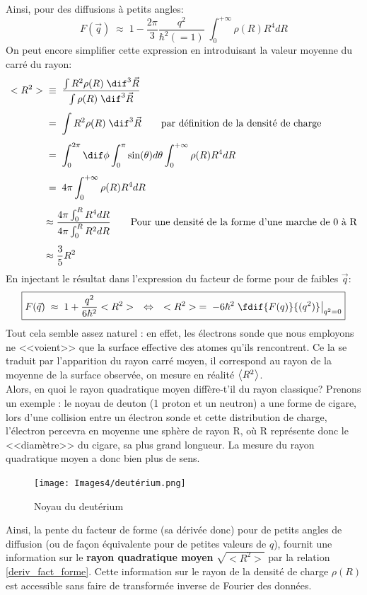 Ainsi, pour des diffusions à petits angles:
\[
    F(\vec{q}) \;\approx\; 1 - \dfrac{2\pi}{3}\dfrac{q^2}{\hbar^2(=1)} \;\int_0^{+\infty}\rho(R) R^4 dR
\]
On peut encore simplifier cette expression en introduisant la valeur moyenne du carré du rayon:
\begin{align*}
    <R^2> &\;\equiv\;
    \dfrac{ \int R^2 \rho(R) \; \dif^3\vec{R} }{ \int \rho(R) \; \dif^3\vec{R} }\\[4pt]
    &\eq
    \int R^2 \rho(R) \; \dif^3\vec{R}
    \qquad \text{par définition de la densité de charge}\\[4pt]
    &\eq
    \int_0^{2\pi}\dif\phi \int_0^{\pi} \sin(\theta) d\theta \int_0^{+\infty}\rho(R) R^4dR\\[4pt]
    &\eq 
    4\pi \int_0^{+\infty}\rho(R) R^4dR\\[4pt]
    &\approx \dfrac{4\pi\int_0^R R^4dR}{4\pi\int_0^R R^2dR} \qquad \text{Pour une densité de la forme d'une marche de 0 à R}\\[4pt]
    &\approx \dfrac{3}{5}R^2
\end{align*}
En injectant le résultat dans l'expression du facteur de forme pour de faibles $\vec{q}$:
\begin{equation}
    \boxed{
    F(\vec{q}) \;\approx\; 1 + \dfrac{q^2}{6\hbar^2} <R^2>
    \quad \Leftrightarrow \quad
    <R^2> \eq -6\hbar^2 \left. \fdif{F(q)}{(q^2)}\right|_{q^2=0}
    }
    \label{deriv_fact_forme}
\end{equation}
Tout cela semble assez naturel :  en effet, les électrons sonde que nous employons ne <<voient>> que la surface effective des atomes qu'ils rencontrent. Ce la se traduit par l'apparition du rayon carré moyen, il correspond au rayon de la moyenne de la surface observée, on mesure en réalité $\expval{R^2}$.\\
Alors, en quoi le rayon quadratique moyen diffère-t'il du rayon classique? Prenons un exemple : le noyau de deuton (1 proton et un neutron) a une forme de cigare, lors d'une collision entre un électron sonde et cette distribution de charge, l'électron percevra en moyenne une sphère de rayon R, où R représente donc le <<diamètre>> du cigare, sa plus grand longueur. La mesure du rayon quadratique moyen a donc bien plus de sens.\\
\begin{figure}[H]
    \centering
    \texttt{[image: Images4/deutérium.png]}
    \caption{Noyau du deutérium}
\end{figure}
Ainsi, la pente du facteur de forme (sa dérivée donc) pour de petits angles de diffusion (ou de façon équivalente pour de petites valeurs de $q$), fournit une information sur le \textbf{rayon quadratique moyen} $\sqrt{<R^2>}$ par la relation \ref{deriv_fact_forme}. Cette information sur le rayon de la densité de charge $\rho(R)$ est accessible sans faire de transformée inverse de Fourier des données.\\
